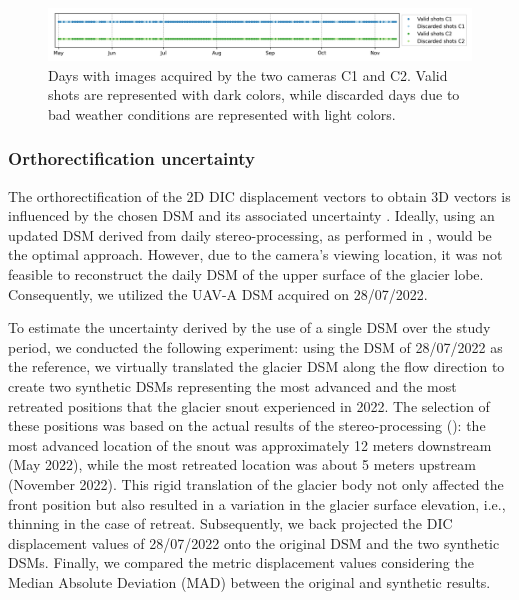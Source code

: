 \begin{figure}[ht!]
  \centering
  \includegraphics[width=162mm]{4_discardes_shots.png}
  \caption{Days with images acquired by the two cameras C1 and C2. Valid shots are
    represented with dark colors, while discarded days due to bad weather conditions are
    represented with light colors.}
  \label{fig:4:discardes_shots}
\end{figure}

\subsubsection{Orthorectification uncertainty}
\label{sec:4:orthorectification_uncertainty}

The orthorectification of the 2D DIC displacement vectors to obtain 3D vectors is
influenced by the chosen DSM and its associated uncertainty \citep{Travelletti2012}.
Ideally, using an updated DSM derived from daily stereo-processing, as performed in
\citet{Marsy2020}, would be the optimal approach.
However, due to the camera's viewing location, it was not feasible to reconstruct the
daily DSM of the upper surface of the glacier lobe. Consequently, we utilized the UAV-A
DSM acquired on 28/07/2022.

To estimate the uncertainty derived by the use of a single DSM over the study period, we
conducted the following experiment: using the DSM of 28/07/2022 as the reference, we
virtually translated the glacier DSM along the flow direction to create two synthetic
DSMs representing the most advanced and the most retreated positions that the glacier
snout experienced in 2022.
The selection of these positions was based on the actual results of the stereo-processing
(): the most advanced location of the snout was
approximately 12 meters
downstream (May 2022), while the most retreated location was about 5 meters upstream
(November 2022). This rigid translation of the glacier body not only affected the front
position but also resulted in a variation in the glacier surface elevation, i.e.,
thinning in the case of retreat.
Subsequently, we back projected the DIC displacement values of 28/07/2022 onto the
original DSM and the two synthetic DSMs. Finally, we compared the metric displacement
values considering the Median Absolute Deviation (MAD) between the original and synthetic
results.

